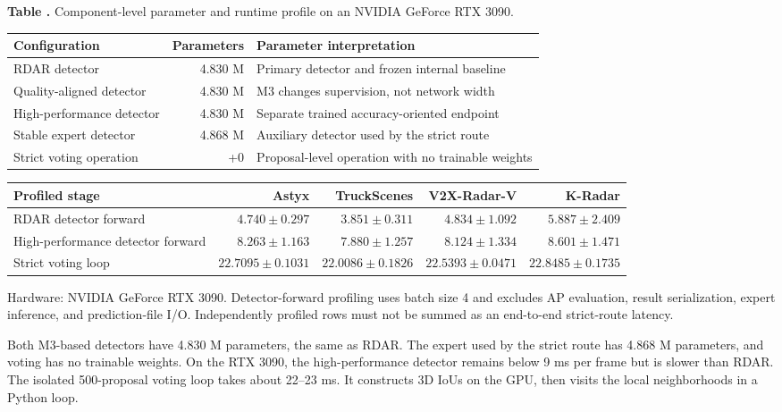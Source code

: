 \documentclass[sensors,article,submit,pdftex,moreauthors]{Definitions/mdpi}
\begin{document}
\begin{samepage}
\noindent\begin{minipage}{\textwidth}
\label{tab:efficiency}
\noindent\textbf{Table \thetable.} Component-level parameter and runtime
profile on an NVIDIA GeForce RTX 3090.\par\vspace{2pt}\scriptsize
\begin{tabularx}{\textwidth}{@{}XrX@{}}
\toprule
Configuration & Parameters & Parameter interpretation \\
\midrule
RDAR detector & 4.830 M & Primary detector and frozen internal baseline \\
Quality-aligned detector & 4.830 M & M3 changes supervision, not network width \\
High-performance detector & 4.830 M & Separate trained accuracy-oriented endpoint \\
Stable expert detector & 4.868 M & Auxiliary detector used by the strict route \\
Strict voting operation & +0 & Proposal-level operation with no trainable weights \\
\bottomrule
\end{tabularx}
\vspace{3pt}
\begin{tabularx}{\textwidth}{@{}Xrrrr@{}}
\toprule
Profiled stage & Astyx & TruckScenes & V2X-Radar-V & K-Radar \\
\midrule
RDAR detector forward & $4.740\pm0.297$ & $3.851\pm0.311$ & $4.834\pm1.092$ & $5.887\pm2.409$ \\
High-performance detector forward & $8.263\pm1.163$ & $7.880\pm1.257$ & $8.124\pm1.334$ & $8.601\pm1.471$ \\
Strict voting loop & $22.7095\pm0.1031$ & $22.0086\pm0.1826$ & $22.5393\pm0.0471$ & $22.8485\pm0.1735$ \\
\bottomrule
\end{tabularx}
\vspace{2pt}\parbox{\textwidth}{\scriptsize
Hardware: NVIDIA GeForce RTX 3090. Detector-forward profiling uses batch size
4 and excludes AP evaluation, result serialization, expert inference, and
prediction-file I/O. Independently profiled rows must not be summed as an
end-to-end strict-route latency.}
\end{minipage}\end{samepage}

Both M3-based detectors have 4.830 M parameters, the same as RDAR. The expert
used by the strict route has 4.868 M parameters, and voting has no trainable
weights. On the RTX 3090, the high-performance detector remains below 9 ms per
frame but is slower than RDAR. The isolated 500-proposal voting loop takes
about 22--23 ms. It constructs 3D IoUs on the GPU, then visits the local
neighborhoods in a Python loop.
\end{document}
